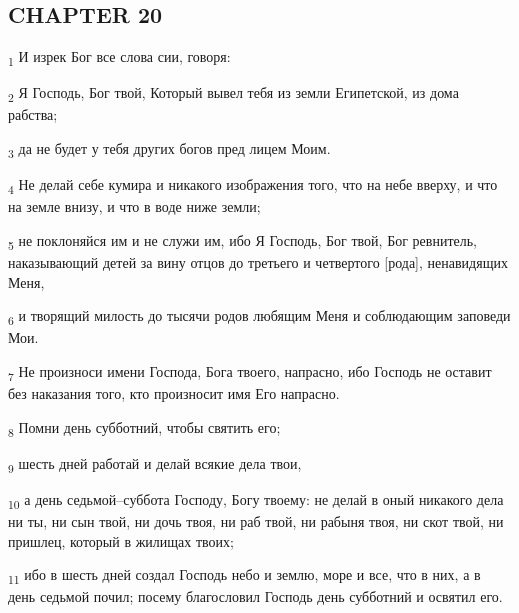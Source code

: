\subsection{CHAPTER 20}
\begin{tcolorbox}
\textsubscript{1} И изрек Бог все слова сии, говоря:
\end{tcolorbox}
\begin{tcolorbox}
\textsubscript{2} Я Господь, Бог твой, Который вывел тебя из земли Египетской, из дома рабства;
\end{tcolorbox}
\begin{tcolorbox}
\textsubscript{3} да не будет у тебя других богов пред лицем Моим.
\end{tcolorbox}
\begin{tcolorbox}
\textsubscript{4} Не делай себе кумира и никакого изображения того, что на небе вверху, и что на земле внизу, и что в воде ниже земли;
\end{tcolorbox}
\begin{tcolorbox}
\textsubscript{5} не поклоняйся им и не служи им, ибо Я Господь, Бог твой, Бог ревнитель, наказывающий детей за вину отцов до третьего и четвертого [рода], ненавидящих Меня,
\end{tcolorbox}
\begin{tcolorbox}
\textsubscript{6} и творящий милость до тысячи родов любящим Меня и соблюдающим заповеди Мои.
\end{tcolorbox}
\begin{tcolorbox}
\textsubscript{7} Не произноси имени Господа, Бога твоего, напрасно, ибо Господь не оставит без наказания того, кто произносит имя Его напрасно.
\end{tcolorbox}
\begin{tcolorbox}
\textsubscript{8} Помни день субботний, чтобы святить его;
\end{tcolorbox}
\begin{tcolorbox}
\textsubscript{9} шесть дней работай и делай всякие дела твои,
\end{tcolorbox}
\begin{tcolorbox}
\textsubscript{10} а день седьмой--суббота Господу, Богу твоему: не делай в оный никакого дела ни ты, ни сын твой, ни дочь твоя, ни раб твой, ни рабыня твоя, ни скот твой, ни пришлец, который в жилищах твоих;
\end{tcolorbox}
\begin{tcolorbox}
\textsubscript{11} ибо в шесть дней создал Господь небо и землю, море и все, что в них, а в день седьмой почил; посему благословил Господь день субботний и освятил его.
\end{tcolorbox}
